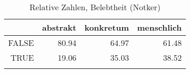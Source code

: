 \begin{table}[ht]
\centering
\begin{tabular}{rrrr}
  \lsptoprule
 & abstrakt & konkretum & menschlich \\ 
  \midrule
FALSE & 80.94 & 64.97 & 61.48 \\ 
  TRUE & 19.06 & 35.03 & 38.52 \\ 
   \lspbottomrule
\end{tabular}
\caption{Relative Zahlen, Belebtheit  (Notker)} 
\end{table}
